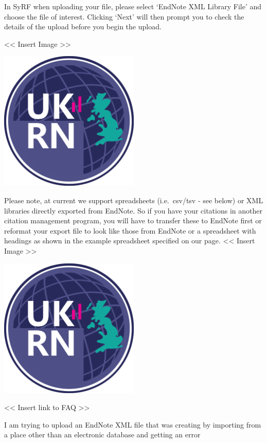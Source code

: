 \documentclass[
]{book}
\begin{document}
In SyRF when uploading your file, please select `EndNote XML Library File' and choose the file of interest. Clicking `Next' will then prompt you to check the details of the upload before you begin the upload.

\textless{}\textless{} Insert Image \textgreater{}\textgreater{}

\includegraphics[width=0.5\textwidth,height=0.5\textheight]{figs/evidence-triangle.png}

Please note, at current we support spreadsheets (i.e.~csv/tsv - see below) or XML libraries directly exported from EndNote. So if you have your citations in another citation management program, you will have to transfer these to EndNote first or reformat your export file to look like those from EndNote or a spreadsheet with headings as shown in the example spreadsheet specified on our page.
\textless{}\textless{} Insert Image \textgreater{}\textgreater{}

\includegraphics[width=0.5\textwidth,height=0.5\textheight]{figs/evidence-triangle.png}

\textless{}\textless{} Insert link to FAQ \textgreater{}\textgreater{}

I am trying to upload an EndNote XML file that was creating by importing from a place other than an electronic database and getting an error
\end{document}
